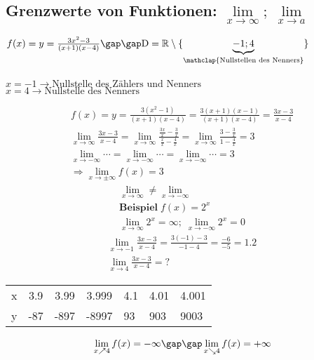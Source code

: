 \subsection{Grenzwerte von Funktionen: $\lim\limits_{x \to \infty};\; \lim\limits_{x \to a}$}
\begin{onepage}
  $f(x) = y = \frac{3x^2 - 3}{(x + 1)(x - 4)} \gap\gap \text{D} = \mathbb{R}\setminus\{\underbrace{-1; 4}_{\mathclap{\text{Nullstellen des Nenners}}}\}$ \\\\
  $x = -1 \rightarrow \text{Nullstelle des Zählers und Nenners}$ \\
  $x = 4 \rightarrow \text{Nullstelle des Nenners}$
\end{onepage}
\begin{gather*}
  f(x) = y = \frac{3(x^2 - 1)}{(x + 1)(x - 4)} = \frac{3(x + 1)(x - 1)}{(x + 1)(x - 4)} = \frac{3x - 3}{x - 4} \\
  \lim\limits_{x \to \infty} \frac{3x - 3}{x - 4} = \lim\limits_{x \to \infty} \frac{\frac{3x}{x} - \frac{3}{x}}{\frac{x}{x} - \frac{4}{x}} = \lim\limits_{x \to \infty} \frac{3 - \frac{3}{x}}{1 - \frac{4}{x}} = 3 \\
  \lim\limits_{x \to -\infty} \cdots = \lim\limits_{x \to -\infty} \cdots = \lim\limits_{x \to -\infty} \cdots = 3 \\
  \Rightarrow \lim\limits_{x \to \pm\infty} f(x) = 3
\end{gather*}
\begin{gather*}
  \lim\limits_{x \to \infty} \neq \lim\limits_{x \to -\infty} \\
  \textbf{Beispiel}\; f(x) = 2^x \\
  \lim\limits_{x \to \infty} 2^x = \infty;\; \lim\limits_{x \to -\infty} 2^x = 0
\end{gather*}
\begin{gather*}
  \lim\limits_{x \to -1} \frac{3x - 3}{x - 4} = \frac{3(-1) - 3}{-1 - 4} = \frac{-6}{-5} = 1.2 \\
  \lim\limits_{x \to 4} \frac{3x - 3}{x - 4} = \text{?}
\end{gather*}
\begin{tabular}{l|lll|lll}
  x & \multicolumn{1}{c}{3.9} & \multicolumn{1}{c}{3.99} & \multicolumn{1}{c|}{3.999} & \multicolumn{1}{c}{4.1} & 4.01 & 4.001 \\
  y & -87                     & -897                     & -8997                      & 93                      & 903  & 9003
\end{tabular}
\begin{gather*}
  \lim\limits_{ x \nearrow 4} f(x) = -\infty \gap\gap \lim\limits_{ x \searrow 4} f(x) = +\infty
\end{gather*}

